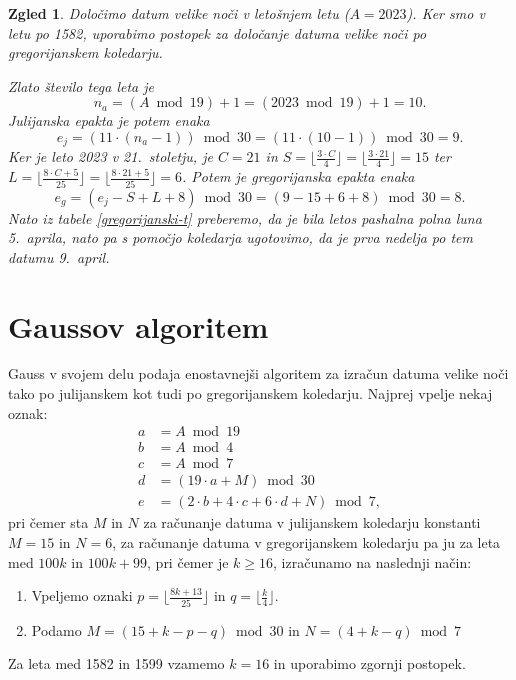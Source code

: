 \documentclass[a4paper,12pt]{article}
\newtheorem{zgled}{Zgled}
\begin{document}
\begin{zgled}
   Določimo datum velike noči v letošnjem letu ($A = 2023$).
   Ker smo v letu po 1582, uporabimo postopek za določanje datuma velike noči 
   po gregorijanskem koledarju. 
   
   Zlato število tega leta je $$n_a = (A \bmod 19) + 1 = (2023 \bmod 19) + 1 = 10.$$
   Julijanska epakta je potem enaka 
   $$e_j = (11 \cdot (n_a - 1)) \bmod 30 = (11 \cdot (10 - 1)) \bmod 30 = 9.$$
   Ker je leto 2023 v 21.\ stoletju, je $C = 21$ in $S = \lfloor \frac{3 \cdot C}{4} \rfloor = \lfloor \frac{3 \cdot 21}{4} \rfloor = 15$ 
   ter $L = \lfloor \frac{8 \cdot C + 5}{25} \rfloor = \lfloor \frac{8 \cdot 21 + 5}{25} \rfloor = 6$.
   Potem je gregorijanska epakta enaka 
   $$e_g = (e_j - S + L + 8) \bmod 30 = (9 - 15 + 6 + 8) \bmod 30 = 8.$$
   Nato iz tabele \ref{gregorijanski-t}
   preberemo, da je bila letos pashalna polna luna 5.\ aprila, nato pa s pomočjo
   koledarja ugotovimo, da je prva nedelja po tem datumu 9.\ april.
\end{zgled}




\section{Gaussov algoritem}

Gauss v svojem delu podaja enostavnejši algoritem za izračun datuma velike 
noči tako po julijanskem kot tudi po gregorijanskem koledarju. Najprej vpelje 
nekaj oznak: 
\begin{align*}
    a &= A \bmod 19 \\
    b &= A \bmod 4 \\
    c &= A \bmod 7 \\
    d &= (19 \cdot a + M) \bmod 30 \\
    e &= (2 \cdot b + 4 \cdot c + 6 \cdot d + N) \bmod 7,
\end{align*}
pri čemer sta $M$ in $N$ za računanje datuma v julijanskem koledarju konstanti
$M = 15$ in $N = 6$, za računanje datuma v gregorijanskem koledarju pa ju za leta 
med $100 k$ in $100 k + 99$, pri čemer je $k \geq 16$, izračunamo na naslednji način: 
\begin{enumerate}
    \item Vpeljemo oznaki $p = \lfloor \frac{8k + 13}{25} \rfloor$ in
       $q = \lfloor \frac{k}{4} \rfloor$.
    \item Podamo $M = (15 + k - p - q) \bmod 30$ in $N = (4 + k - q) \bmod 7$
\end{enumerate}
Za leta med 1582 in 1599 vzamemo $k = 16$ in uporabimo zgornji postopek.
\end{document}
